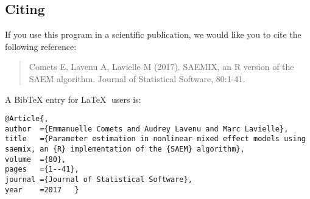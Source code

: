 \subsection{Citing \monolix}

\hskip 18pt If you use this program in a scientific publication, we would like
you to cite the following reference:
\begin{quotation}
\noindent 
Comets E, Lavenu A, Lavielle M (2017). SAEMIX, an R version of the SAEM algorithm. Journal of Statistical Software, 80:1-41.
\end{quotation}

A BibTeX entry for \LaTeX$\;$ users is:

\begin{verbatim}
@Article{,
author	={Emmanuelle Comets and Audrey Lavenu and Marc Lavielle},
title	={Parameter estimation in nonlinear mixed effect models using saemix, an {R} implementation of the {SAEM} algorithm},
volume	={80},
pages	={1--41},
journal	={Journal of Statistical Software},
year	=2017	}
\end{verbatim}

